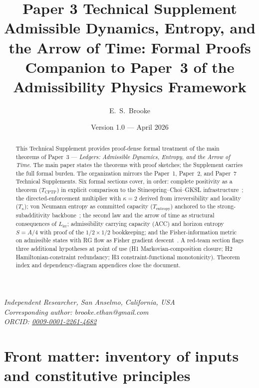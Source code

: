 \documentclass[11pt]{article}
\title{\textbf{Paper 3 Technical Supplement}\\[0.4em]
\large Admissible Dynamics, Entropy, and the Arrow of Time: Formal Proofs\\[0.2em]
\normalsize Companion to Paper~3 of the Admissibility Physics Framework}
\author{E.\ S.\ Brooke}
\date{Version 1.0 --- April 2026}
\theoremstyle{remark}
\begin{document}
\maketitle

\noindent\textit{Independent Researcher, San Anselmo, California, USA}\\
\textit{Corresponding author: brooke.ethan@gmail.com}\\
\textit{ORCID: \href{https://orcid.org/0009-0001-2261-4682}{0009-0001-2261-4682}}

\bigskip

\begin{abstract}
\noindent This Technical Supplement provides proof-dense formal treatment of
the main theorems of Paper~3 --- \emph{Ledgers: Admissible Dynamics,
Entropy, and the Arrow of Time}.  The main paper states the theorems with
proof sketches; the Supplement carries the full formal burden.  The
organization mirrors the Paper~1, Paper~2, and Paper~7 Technical Supplements.
Six formal sections cover, in order: complete positivity as a theorem
($T_{\mathrm{CPTP}}$) in explicit comparison to the Stinespring--Choi--GKSL
infrastructure~\cite{Stinespring1955,Choi1975,Lindblad1976,GKS1976,Kraus1983};
the directed-enforcement multiplier with $\kappa=2$ derived from
irreversibility and locality ($T_\kappa$); von Neumann entropy as committed
capacity ($T_{\mathrm{entropy}}$) anchored to the strong-subadditivity
backbone~\cite{LiebRuskai1973,Wehrl1978}; the second law and the arrow of
time as structural consequences of $L_{\mathrm{irr}}$; admissibility carrying
capacity (ACC) and horizon entropy $S=A/4$ with proof of the $1/2\times 1/2$
bookkeeping; and the Fisher-information metric on admissible states with RG
flow as Fisher gradient descent~\cite{BraunsteinCaves1994,Petz1996,AmariNagaoka2000}.
A red-team section flags three additional hypotheses at point of use
(H1 Markovian-composition closure; H2 Hamiltonian-constraint redundancy;
H3 constraint-functional monotonicity).  Theorem index and dependency-diagram
appendices close the document.
\end{abstract}

\bigskip
\tableofcontents
\bigskip


\section{Front matter: inventory of inputs and constitutive principles}
\label{sec:inputs}
\end{document}
